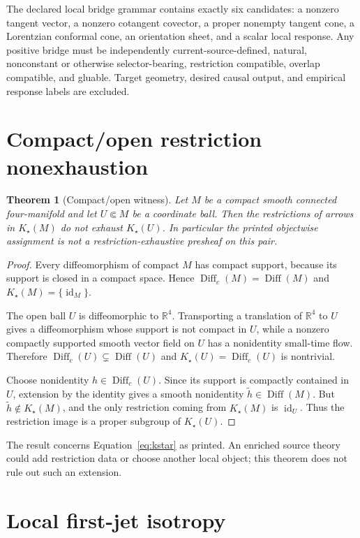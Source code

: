 \documentclass[11pt]{article}
\newtheorem{theorem}{Theorem}
\newcommand{\Diff}{\operatorname{Diff}}
\newcommand{\Diffc}{\operatorname{Diff}_{c}}
\newcommand{\Kstar}{K_{\star}}
\begin{document}
The declared local bridge grammar contains exactly six candidates: a nonzero
tangent vector, a nonzero cotangent covector, a proper nonempty tangent cone,
a Lorentzian conformal cone, an orientation sheet, and a scalar local
response.  Any positive bridge must be independently current-source-defined,
natural, nonconstant or otherwise selector-bearing, restriction compatible,
overlap compatible, and gluable.  Target geometry, desired causal output, and
empirical response labels are excluded.

\section{Compact/open restriction nonexhaustion}

\begin{theorem}[Compact/open witness]
Let $M$ be a compact smooth connected four-manifold and let $U\Subset M$ be
a coordinate ball.  Then the restrictions of arrows in $\Kstar(M)$ do not
exhaust $\Kstar(U)$.  In particular the printed objectwise assignment is not
a restriction-exhaustive presheaf on this pair.
\end{theorem}

\begin{proof}
Every diffeomorphism of compact $M$ has compact support, because its support
is closed in a compact space.  Hence $\Diffc(M)=\Diff(M)$ and
$\Kstar(M)=\{\operatorname{id}_{M}\}$.

The open ball $U$ is diffeomorphic to $\mathbb{R}^{4}$.  Transporting a
translation of $\mathbb{R}^{4}$ to $U$ gives a diffeomorphism whose support is
not compact in $U$, while a nonzero compactly supported smooth vector field
on $U$ has a nonidentity small-time flow.  Therefore
$\Diffc(U)\subsetneq\Diff(U)$ and $\Kstar(U)=\Diffc(U)$ is nontrivial.

Choose nonidentity $h\in\Diffc(U)$.  Since its support is compactly contained
in $U$, extension by the identity gives a smooth nonidentity
$\widetilde h\in\Diff(M)$.  But $\widetilde h\notin\Kstar(M)$, and the only
restriction coming from $\Kstar(M)$ is $\operatorname{id}_{U}$.  Thus the
restriction image is a proper subgroup of $\Kstar(U)$.
\end{proof}

The result concerns Equation~\eqref{eq:kstar} as printed.  An enriched source
theory could add restriction data or choose another local object; this theorem
does not rule out such an extension.

\section{Local first-jet isotropy}
\end{document}
